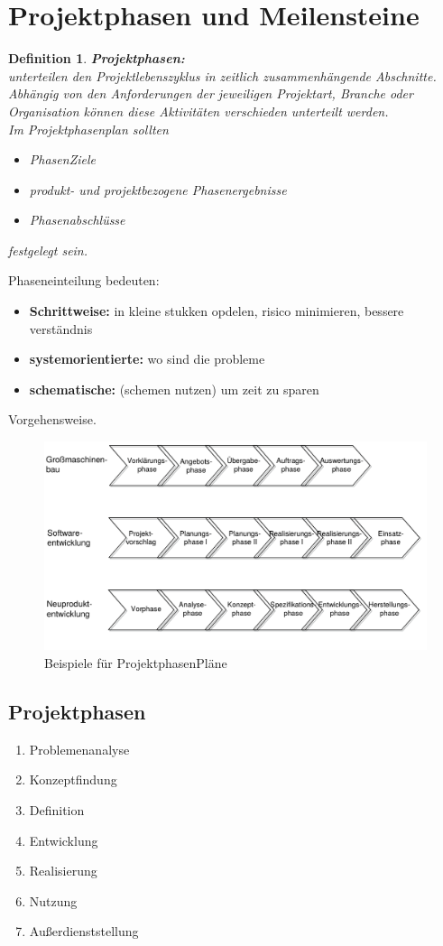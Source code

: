 \documentclass[11pt,a4paper]{article}
\newenvironment{de}[1]
{\begin{mdframed}[style=de]\begin{mydef}{\textbf{#1:}}\\} 
{\end{mydef}\end{mdframed}}
\newtheorem{mydef}{Definition}
\begin{document}
\section{Projektphasen und Meilensteine}

\begin{de}{Projektphasen}
unterteilen den Projektlebenszyklus in zeitlich
zusammenhängende Abschnitte. Abhängig von den Anforderungen der
jeweiligen Projektart, Branche oder Organisation können diese Aktivitäten
verschieden unterteilt werden.\\
Im Projektphasenplan sollten
\begin{itemize}
\item PhasenZiele
\item produkt- und projektbezogene Phasenergebnisse
\item Phasenabschlüsse
\end{itemize}
festgelegt sein.
\end{de}
Phaseneinteilung bedeuten:
\begin{itemize}
\item \textbf{Schrittweise:} in kleine stukken opdelen, risico minimieren, bessere verständnis
\item \textbf{systemorientierte:} wo sind die probleme
\item \textbf{schematische:} (schemen nutzen) um zeit zu sparen 
\end{itemize}
Vorgehensweise.
\begin{figure}[H]
	\centering
	\caption{Beispiele für ProjektphasenPläne}
	\includegraphics[scale=0.25]{ch7/projektphasenplane}
\end{figure}
\subsection{Projektphasen}
\begin{enumerate}
\item Problemenanalyse
\item Konzeptfindung
\item Definition
\item Entwicklung
\item Realisierung
\item Nutzung
\item Außerdienststellung
\end{enumerate}
\end{document}

